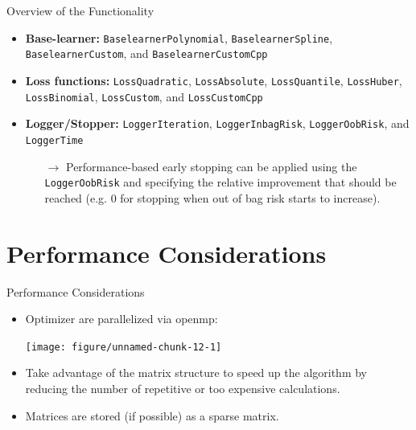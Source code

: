 \documentclass[10pt]{beamer}\usepackage[]{graphicx}\usepackage[]{color}
\newenvironment{knitrout}{}{} %
\begin{document}
\begin{frame}{Overview of the Functionality}

\begin{itemize}

  \item
    \textbf{Base-learner:} \texttt{BaselearnerPolynomial}, \texttt{BaselearnerSpline}, \texttt{BaselearnerCustom}, and \texttt{BaselearnerCustomCpp}

  \item
    \textbf{Loss functions:} \texttt{LossQuadratic}, \texttt{LossAbsolute}, \texttt{LossQuantile}, \texttt{LossHuber}, \texttt{LossBinomial}, \texttt{LossCustom}, and \texttt{LossCustomCpp}

  \item
    \textbf{Logger/Stopper:} \texttt{LoggerIteration}, \texttt{LoggerInbagRisk}, \texttt{LoggerOobRisk}, and \texttt{LoggerTime} \\
    \begin{itemize}
      \item[$\rightarrow$]
        Performance-based early stopping can be applied using the \texttt{LoggerOobRisk} and specifying the relative improvement that should be reached (e.g. 0 for stopping when out of bag risk starts to increase).
    \end{itemize}

\end{itemize}

\end{frame}

\section{Performance Considerations}

\begin{frame}{Performance Considerations}


\begin{itemize}

  \item
    Optimizer are parallelized via openmp:\vspace{0.3cm}

\begin{knitrout}
\color{fgcolor}

{\centering \texttt{[image: figure/unnamed-chunk-12-1]} 

}



\end{knitrout}

  \item
    Take advantage of the matrix structure to speed up the algorithm by reducing the number of repetitive or too expensive calculations.

  \item
    Matrices are stored (if possible) as a sparse matrix.

\end{itemize}

\end{frame}
\end{document}
